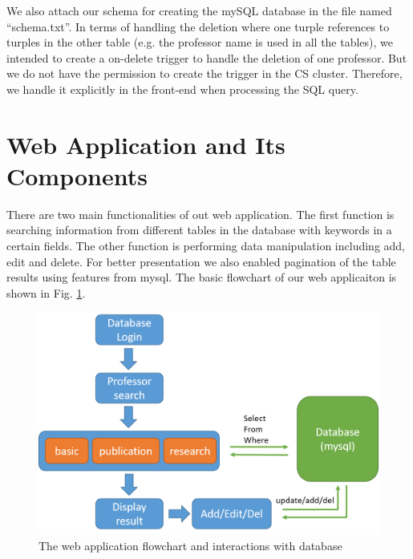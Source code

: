 \documentclass[authoryear,preprint,final,12pt]{elsarticle}
\begin{document}
We also attach our schema for creating the mySQL database in the file named ``schema.txt''.
%
In terms of handling the deletion where one turple references to turples in the other table (e.g. the professor name is used in all the tables), we intended to create a on-delete trigger to handle the deletion of one professor. But we do not have the permission to create the trigger in the CS cluster. Therefore, we handle it explicitly in the front-end when processing the SQL query.


\section{Web Application and Its Components}

There are two main functionalities of out web application. The first function is searching information from different tables in the database with keywords in a certain fields. The other function is performing data manipulation including add, edit and delete. For better presentation we also enabled pagination of the table results using features from mysql. The basic flowchart of our web applicaiton is shown in Fig. \ref{fig:1}.

\begin{figure}[h]
\centering
\includegraphics[width=5.0in]{flowchart.png}
\caption{The web application flowchart and interactions with database}
\label{fig:1}
\end{figure}
\end{document}
